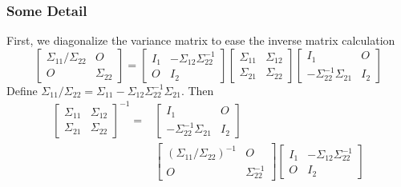 \documentclass{beamer}
\begin{document}
\begin{frame}
	\frametitle{Some Detail}
	First, we diagonalize the variance matrix to ease the inverse matrix calculation
	\[\left[ {\begin{array}{*{20}{c}}
	{{\Sigma _{11}}/{\Sigma _{22}}}&O\\
	O&{{\Sigma _{22}}}
	\end{array}} \right] = \left[ {\begin{array}{*{20}{c}}
	{{I_1}}&{ - {\Sigma _{12}}\Sigma _{22}^{ - 1}}\\
	O&{{I_2}}
	\end{array}} \right]\left[ {\begin{array}{*{20}{c}}
	{{\Sigma _{11}}}&{{\Sigma _{12}}}\\
	{{\Sigma _{21}}}&{{\Sigma _{22}}}
	\end{array}} \right]\left[ {\begin{array}{*{20}{c}}
	{{I_1}}&O\\
	{ - \Sigma _{22}^{ - 1}{\Sigma _{21}}}&{{I_2}}
	\end{array}} \right]\]
	Define ${\Sigma _{11}}/{\Sigma _{22}} = {\Sigma _{11}} - {\Sigma _{12}}\Sigma _{22}^{ - 1}{\Sigma _{21}}$.
	Then
	\[
	\begin{split}
	{\left[ {\begin{array}{*{20}{c}}
			{{\Sigma _{11}}}&{{\Sigma _{12}}}\\
			{{\Sigma _{21}}}&{{\Sigma _{22}}}
			\end{array}} \right]^{ - 1}} = & \left[ {\begin{array}{*{20}{c}}
		{{I_1}}&O\\
		{ - \Sigma _{22}^{ - 1}{\Sigma _{21}}}&{{I_2}}
		\end{array}} \right] \\
		& \left[ {\begin{array}{*{20}{c}}
		{{{({\Sigma _{11}}/{\Sigma _{22}})}^{ - 1}}}&O\\
		O&{\Sigma _{22}^{ - 1}}
		\end{array}} \right]\left[ {\begin{array}{*{20}{c}}
		{{I_1}}&{ - {\Sigma _{12}}\Sigma _{22}^{ - 1}}\\
		O&{{I_2}}
		\end{array}} \right]
	\end{split}
	\]
\end{frame}
\end{document}
